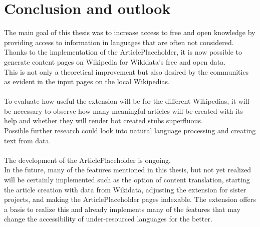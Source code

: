 \chapter{Conclusion and outlook}

The main goal of this thesis was to increase access to free and open knowledge by providing access to information in languages that are often not considered. Thanks to the implementation of the ArticlePlaceholder, it is now possible to generate content pages on Wikipedia for Wikidata's free and open data. \\
This is not only a theoretical improvement but also desired by the communities as evident in the input pages on the local Wikipedias. \\
\\
To evaluate how useful the extension will be for the different Wikipedias, it will be necessary to observe how many meaningful articles will be created with its help and whether they will render bot created stubs superfluous. \\
Possible further research could look into natural language processing and creating text from data. \\
\\
The development of the ArticlePlaceholder is ongoing. \\
In the future, many of the features mentioned in this thesis, but not yet realized will be certainly implemented such as the option of content translation, starting the article creation with data from Wikidata, adjusting the extension for sister projects, and making the ArticlePlaceholder pages indexable. The extension offers a basis to realize this and already implements many of the features that may change the accessibility of under-resourced languages for the better. 
